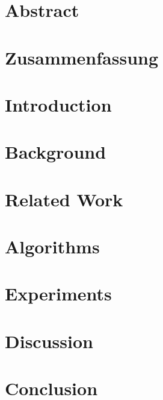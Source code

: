 \documentclass[12pt]{scrbook}
\begin{document}
\chapter*{Abstract}

\thispagestyle{empty}

\chapter*{Zusammenfassung}

\thispagestyle{empty}

\tableofcontents
\thispagestyle{empty}


\setcounter{page}{1}
\chapter{Introduction}


\chapter{Background}


\chapter{Related Work}


\chapter{Algorithms}


\chapter{Experiments}


\chapter{Discussion}


\chapter{Conclusion}


\printbibliography
\end{document}
